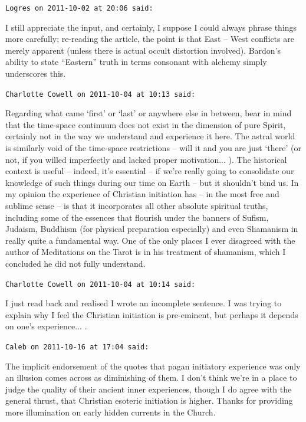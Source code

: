 \begin{footnotesize}
\begin{sffamily}
\texttt{Logres on 2011-10-02 at 20:06 said:}

I still appreciate the input, and certainly, I suppose I could always phrase things more carefully; re-reading the article, the point is that East -- West conflicts are merely apparent (unless there is actual occult distortion involved). Bardon's ability to state ``Eastern'' truth in terms consonant with alchemy simply underscores this.

\hfill

\texttt{Charlotte Cowell on 2011-10-04 at 10:13 said:}

Regarding what came `first' or `last' or anywhere else in between, bear in mind that the time-space continuum does not exist in the dimension of pure Spirit, certainly not in the way we understand and experience it here. The astral world is similarly void of the time-space restrictions -- will it and you are just `there' (or not, if you willed imperfectly and lacked proper motivation... ). The historical context is useful -- indeed, it's essential -- if we're really going to consolidate our knowledge of such things during our time on Earth -- but it shouldn't bind us. In my opinion the experience of Christian initiation has -- in the most free and sublime sense -- is that it incorporates all other absolute spiritual truths, including some of the essences that flourish under the banners of Sufism, Judaism, Buddhism (for physical preparation especially) and even Shamanism in really quite a fundamental way. One of the only places I ever disagreed with the author of Meditations on the Tarot is in his treatment of shamanism, which I concluded he did not fully understand.

\hfill

\texttt{Charlotte Cowell on 2011-10-04 at 10:14 said:}

I just read back and realised I wrote an incomplete sentence. I was trying to explain why I feel the Christian initiation is pre-eminent, but perhaps it depends on one's experience... .

\hfill

\texttt{Caleb on 2011-10-16 at 17:04 said:}

The implicit endorsement of the quotes that pagan initiatory experience was only an illusion comes across as diminishing of them. I don't think we're in a place to judge the quality of their ancient inner experiences, though I do agree with the general thrust, that Christian esoteric initiation is higher. Thanks for providing more illumination on early hidden currents in the Church.


\end{sffamily}
\end{footnotesize}
